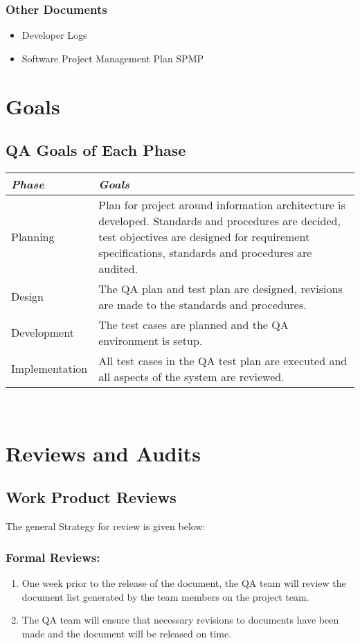 \documentclass[a3paper, 11pt]{article}
\begin{document}
\subsubsection{Other Documents}

\begin{itemize}
	\setlength\itemsep{-0.25em}
	\item Developer Logs
	\item Software Project Management Plan {SPMP}
\end{itemize}
\par


\section{Goals}
\subsection{QA Goals of Each Phase}
	\begin{tabular} {|l|p{13cm}|}
		\hline
		\textit{\textbf{Phase}} & \textit{\textbf{Goals}} \\ \hline
		Planning & Plan for project around information architecture is developed. Standards and procedures are decided, test objectives are designed for requirement specifications, standards and procedures are audited.   \\ \hline
		Design & The QA plan and test plan are designed, revisions are made to the standards and procedures.   \\ \hline
		Development & The test cases are planned and the QA environment is setup.  \\ \hline
		Implementation & All test cases in the QA test plan are executed and all aspects of the system are reviewed. \\ \hline
	\end{tabular}
\\
\par

\section{Reviews and Audits}
\subsection{Work Product Reviews}
The general Strategy for review is given below:

\subsubsection{Formal Reviews:}
\begin{enumerate}
	\setlength\itemsep{-0.25em}
	\item One week prior to the release of the document, the QA team will review the document list generated by the team members on the project team. 
	\item The QA team will ensure that necessary revisions to documents have been made and the document will be released on time. 
\end{enumerate}
\end{document}
